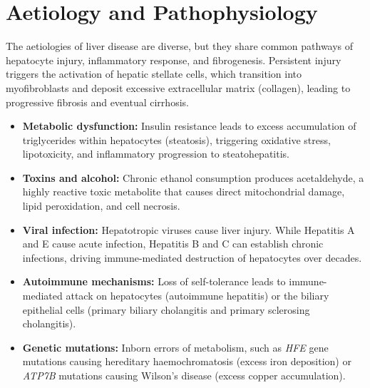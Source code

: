 \section*{Aetiology and Pathophysiology}
The aetiologies of liver disease are diverse, but they share common pathways of hepatocyte injury, inflammatory response, and fibrogenesis. Persistent injury triggers the activation of hepatic stellate cells, which transition into myofibroblasts and deposit excessive extracellular matrix (collagen), leading to progressive fibrosis and eventual cirrhosis.
\begin{itemize}
    \item \textbf{Metabolic dysfunction:} Insulin resistance leads to excess accumulation of triglycerides within hepatocytes (steatosis), triggering oxidative stress, lipotoxicity, and inflammatory progression to steatohepatitis.
    \item \textbf{Toxins and alcohol:} Chronic ethanol consumption produces acetaldehyde, a highly reactive toxic metabolite that causes direct mitochondrial damage, lipid peroxidation, and cell necrosis.
    \item \textbf{Viral infection:} Hepatotropic viruses cause liver injury. While Hepatitis A and E cause acute infection, Hepatitis B and C can establish chronic infections, driving immune-mediated destruction of hepatocytes over decades.
    \item \textbf{Autoimmune mechanisms:} Loss of self-tolerance leads to immune-mediated attack on hepatocytes (autoimmune hepatitis) or the biliary epithelial cells (primary biliary cholangitis and primary sclerosing cholangitis).
    \item \textbf{Genetic mutations:} Inborn errors of metabolism, such as \textit{HFE} gene mutations causing hereditary haemochromatosis (excess iron deposition) or \textit{ATP7B} mutations causing Wilson's disease (excess copper accumulation).
\end{itemize}

